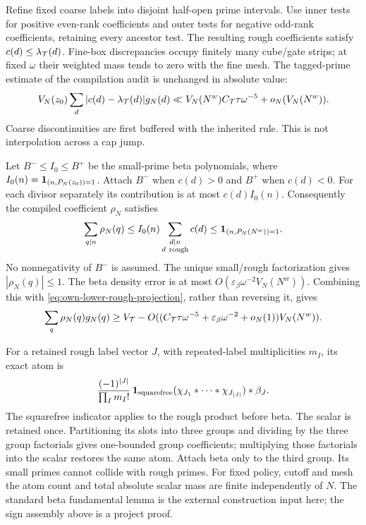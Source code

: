 Refine fixed coarse labels into disjoint half-open prime intervals.
Use inner tests for positive even-rank coefficients and outer tests
for negative odd-rank coefficients, retaining every ancestor test.
The resulting rough coefficients satisfy \(c(d)\le\lambda_{\cal T}(d)\).
Fine-box discrepancies occupy finitely many cube/gate strips; at
fixed \(\omega\) their weighted mass tends to zero with the fine mesh.
The tagged-prime estimate of the compilation audit is unchanged in
absolute value:
\[
 V_N(z_0)\sum_d|c(d)-\lambda_{\cal T}(d)|g_N(d)
 \ll V_N(N^w)C_{\cal T}\tau\omega^{-5}+o_N(V_N(N^w)).
\]
Coarse discontinuities are first buffered with the inherited rule.
This is not interpolation across a cap jump.

Let \(B^-\le I_0\le B^+\) be the small-prime beta polynomials, where
\(I_0(n)={\bf1}_{(n,P_N(z_0))=1}\).
Attach \(B^-\) when \(c(d)>0\) and \(B^+\) when \(c(d)<0\).
For each divisor separately its contribution is at most \(c(d)I_0(n)\).
Consequently the compiled coefficient \(\rho_N\) satisfies
\begin{equation}\label{eq:own-lower-compiled-pointwise}
 \sum_{q\mid n}\rho_N(q)
 \le I_0(n)\sum_{\substack{d\mid n\\d\ {\rm rough}}}c(d)
 \le{\bf1}_{(n,P_N(N^w))=1}.
\end{equation}
No nonnegativity of \(B^-\) is assumed. The unique small/rough
factorization gives \(|\rho_N(q)|\le1\). The beta density error is at
most \(O(\varepsilon_\beta\omega^{-2}V_N(N^w))\). Combining this with
\eqref{eq:own-lower-rough-projection}, rather than reversing it, gives
\[
 \sum_q\rho_N(q)g_N(q)\ge
 V_{\cal T}-O((C_{\cal T}\tau\omega^{-5}
              +\varepsilon_\beta\omega^{-2}+o_N(1))V_N(N^w)).
\]

For a retained rough label vector \(J\), with repeated-label
multiplicities \(m_I\), its exact atom is
\[
 \frac{(-1)^{|J|}}{\prod_I m_I!}\,
 {\bf1}_{\rm squarefree}
   (\chi_{J_1}*\cdots*\chi_{J_{|J|}})*\beta_J.
\]
The squarefree indicator applies to the rough product before beta.
The scalar is retained once. Partitioning its slots into three groups
and dividing by the three group factorials gives one-bounded group
coefficients; multiplying those factorials into the scalar restores
the same atom. Attach beta only to the third group. Its small primes
cannot collide with rough primes. For fixed policy, cutoff and mesh
the atom count and total absolute scalar mass are finite independently
of \(N\). The standard beta fundamental lemma is the external
construction input here; the sign assembly above is a project proof.


